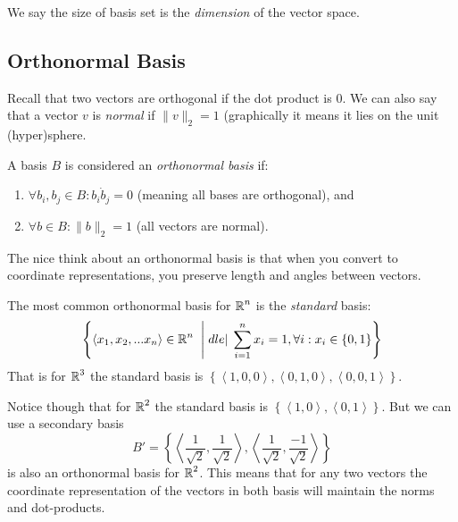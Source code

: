 We say the size of basis set is the \emph{dimension} of the vector space. 

\subsection{Orthonormal Basis}
Recall that two vectors are orthogonal if the dot product is 0. 
We can also say that a vector $v$ is \emph{normal} if $\|v\|_2=1$ (graphically it means it lies on the unit (hyper)sphere. 

A basis $B$ is considered an \emph{orthonormal basis} if:
\begin{enumerate}
\item $\forall b_i, b_j\in B: b_i \dot b_j = 0$ (meaning all bases are orthogonal), and 
\item $\forall b \in B : \|b\|_2=1$ (all vectors are normal). 
\end{enumerate}

The nice think about an orthonormal basis is that when you convert to coordinate representations, you preserve length and angles between vectors. 

The most common orthonormal basis for $\operatorname{\mathbb{R}}^n$ is the \emph{standard} basis: 
\[\left\{\left\langle x_1, x_2, ... x_n\right\rangle \in \operatorname{\mathbb{R}}^n \;\;\middle|\;dle|\; \sum_{i=1}^n x_i = 1, \forall i : x_i \in \left\{0,1\right\}\right\}\]
That is for $\operatorname{\mathbb{R}}^3$ the standard basis is $\left\{\left\langle1,0,0\right\rangle,\left\langle0,1,0\right\rangle,\left\langle0,0,1\right\rangle\right\}$.

Notice though that for $\operatorname{\mathbb{R}}^2$ the standard basis is $\left\{\left\langle1,0\right\rangle,\left\langle0,1\right\rangle\right\}$.
But we can use a secondary basis \[B'=\left\{\left\langle\frac{1}{\sqrt{2}},\frac{1}{\sqrt{2}}\right\rangle,\left\langle\frac{1}{\sqrt{2}},\frac{-1}{\sqrt{2}}\right\rangle\right\}\] is also an orthonormal basis for $\operatorname{\mathbb{R}}^2$. 
This means that for any two vectors the coordinate representation of the vectors in both basis will maintain the norms and dot-products. 

